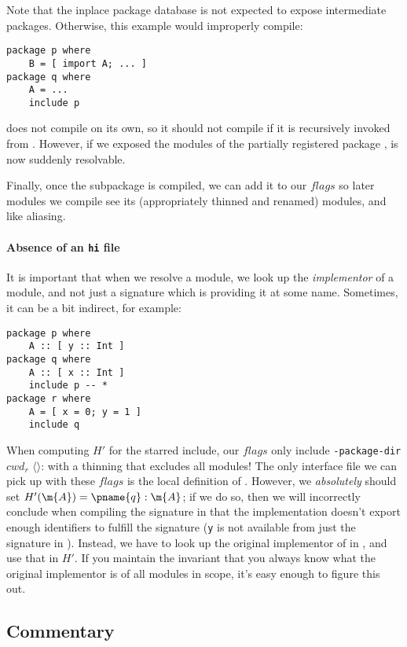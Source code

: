 \documentclass{article}
\begin{document}
Note that the inplace package database is not expected to expose intermediate
packages. Otherwise, this example would improperly compile:

\begin{verbatim}
package p where
    B = [ import A; ... ]
package q where
    A = ...
    include p
\end{verbatim}

 does not compile on its own, so it should not compile if it is
recursively invoked from .  However, if we exposed the modules
of the partially registered package ,  is now suddenly
resolvable.

Finally, once the subpackage is compiled, we can add it to our $flags$ so later
modules we compile see its (appropriately thinned and renamed) modules, and like
aliasing.

\paragraph{Absence of an \texttt{hi} file}
It is important that when we resolve a module, we look up the \emph{implementor}
of a module, and not just a signature which is providing it at some name.
Sometimes, it can be a bit indirect, for example:

\begin{verbatim}
package p where
    A :: [ y :: Int ]
package q where
    A :: [ x :: Int ]
    include p -- *
package r where
    A = [ x = 0; y = 1 ]
    include q
\end{verbatim}

When computing $H'$ for the starred include, our $flags$ only include
\texttt{-package-dir}  $cwd_r$ $\langle\rangle$: with a thinning
that excludes all modules!  The only interface file we can pick up with these
$flags$ is the local definition of .  However, we \emph{absolutely}
should set $H'(\m{A})=\pname{q}:\m{A}$; if we do so, then we will incorrectly
conclude when compiling the signature in  that the implementation
doesn't export enough identifiers to fulfill the signature (\texttt{y} is not
available from just the signature in ).  Instead, we have to look
up the original implementor of  in , and use that in $H'$.
If you maintain the invariant that you always know what the original implementor
is of all modules in scope, it's easy enough to figure this out.

\subsection{Commentary}
\end{document}
